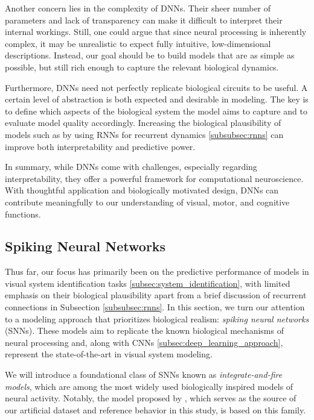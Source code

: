 Another concern lies in the complexity of DNNs. Their sheer number of parameters and lack of transparency can make it difficult to interpret their internal workings. Still, one could argue that since neural processing is inherently complex, it may be unrealistic to expect fully intuitive, low-dimensional descriptions. Instead, our goal should be to build models that are as simple as possible, but still rich enough to capture the relevant biological dynamics.

Furthermore, DNNs need not perfectly replicate biological circuits to be useful. A certain level of abstraction is both expected and desirable in modeling. The key is to define which aspects of the biological system the model aims to capture and to evaluate model quality accordingly. Increasing the biological plausibility of models such as by using RNNs for recurrent dynamics \ref{subsubsec:rnns} can improve both interpretability and predictive power.

In summary, while DNNs come with challenges, especially regarding interpretability, they offer a powerful framework for computational neuroscience. With thoughtful application and biologically motivated design, DNNs can contribute meaningfully to our understanding of visual, motor, and cognitive functions.

\subsection{Spiking Neural Networks}
\label{subsec:spiking_neural_nets}
Thus far, our focus has primarily been on the predictive performance of models in visual system identification tasks \ref{subsec:system_identification}, with limited emphasis on their biological plausibility apart from a brief discussion of recurrent connections in Subsection \ref{subsubsec:rnns}. In this section, we turn our attention to a modeling approach that prioritizes biological realism: \emph{spiking neural networks} (SNNs). These models aim to replicate the known biological mechanisms of neural processing and, along with CNNs \ref{subsec:deep_learning_approach}, represent the state-of-the-art in visual system modeling.

We will introduce a foundational class of SNNs known as \emph{integrate-and-fire models}, which are among the most widely used biologically inspired models of neural activity. Notably, the model proposed by \citet{antolik2024comprehensive}, which serves as the source of our artificial dataset and reference behavior in this study, is based on this family.

